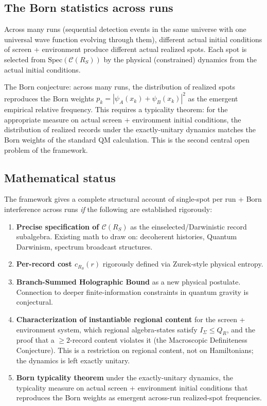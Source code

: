 \documentclass[11pt,a4paper]{article}
\begin{document}
\subsection{The Born statistics across runs}

Across many runs (sequential detection events in the same universe with one universal wave function evolving through them), different actual initial conditions of screen + environment produce different actual realized spots. Each spot is selected from $\mathrm{Spec}(\mathcal{C}(R_S))$ by the physical (constrained) dynamics from the actual initial conditions.

The Born conjecture: across many runs, the distribution of realized spots reproduces the Born weights $p_k = |\psi_A(x_k) + \psi_B(x_k)|^2$ as the emergent empirical relative frequency. This requires a typicality theorem: for the appropriate measure on actual screen + environment initial conditions, the distribution of realized records under the exactly-unitary dynamics matches the Born weights of the standard QM calculation. This is the second central open problem of the framework.

\subsection{Mathematical status}

The framework gives a complete structural account of single-spot per run + Born interference across runs \emph{if} the following are established rigorously:

\begin{enumerate}
  \item \textbf{Precise specification of $\mathcal{C}(R_S)$} as the einselected/Darwinistic record subalgebra. Existing math to draw on: decoherent histories, Quantum Darwinism, spectrum broadcast structures.
  \item \textbf{Per-record cost $c_{R_S}(r)$} rigorously defined via Zurek-style physical entropy.
  \item \textbf{Branch-Summed Holographic Bound} as a new physical postulate. Connection to deeper finite-information constraints in quantum gravity is conjectural.
  \item \textbf{Characterization of instantiable regional content} for the screen + environment system, which regional algebra-states satisfy $I_\Sigma \le Q_R$, and the proof that a $\ge 2$-record content violates it (the Macroscopic Definiteness Conjecture). This is a restriction on regional content, not on Hamiltonians; the dynamics is left exactly unitary.
  \item \textbf{Born typicality theorem} under the exactly-unitary dynamics, the typicality measure on actual screen + environment initial conditions that reproduces the Born weights as emergent across-run realized-spot frequencies.
\end{enumerate}
\end{document}
